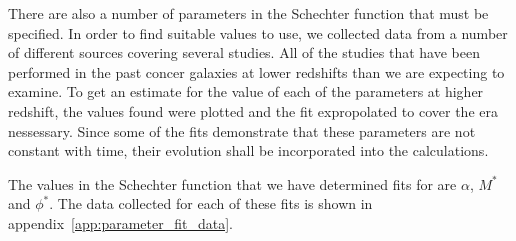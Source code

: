     There are also a number of parameters in the Schechter function that must be specified. In order to find suitable values to use, we collected data from a number of different sources covering several studies. All of the studies that have been performed in the past concer galaxies at lower redshifts than we are expecting to examine. To get an estimate for the value of each of the parameters at higher redshift, the values found were plotted and the fit expropolated to cover the era nessessary. Since some of the fits demonstrate that these parameters are not constant with time, their evolution shall be incorporated into the calculations.

    The values in the Schechter function that we have determined fits for are $\alpha$, $M^{*}$ and $\phi^{*}$. The data collected for each of these fits is shown in appendix~\ref{app:parameter_fit_data}.
    
